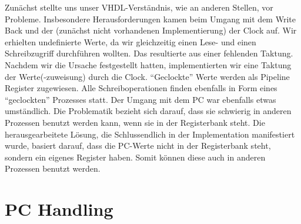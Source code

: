 \documentclass[paper=a4,fontsize=12pt,twocolumn]{scrreprt}
\begin{document}



Zunächst stellte uns unser VHDL-Verständnis, wie an anderen Stellen, vor Probleme.
Insbesondere Herausforderungen kamen beim Umgang mit dem Write Back und der (zunächst nicht vorhandenen Implementierung) der Clock auf.
Wir erhielten undefinierte Werte, da wir gleichzeitig einen Lese- und einen Schreibzugriff durchführen wollten.
Das resultierte aus einer fehlenden Taktung.
Nachdem wir die Ursache festgestellt hatten, implementierten wir eine Taktung der Werte(-zuweisung) durch die Clock.
\enquote{Geclockte} Werte werden als Pipeline Register zugewiesen.
Alle Schreiboperationen finden ebenfalls in Form eines \enquote{geclockten} Prozesses statt. Der Umgang mit dem PC war ebenfalls etwas umständlich.
Die Problematik bezieht sich darauf, dass sie schwierig in anderen Prozessen benutzt werden kann, wenn sie in der Registerbank steht.
Die herausgearbeitete Lösung, die Schlussendlich in der Implementation manifestiert wurde, basiert darauf, dass die PC-Werte nicht in der Registerbank steht, sondern ein eigenes Register haben.
Somit können diese auch in anderen Prozessen benutzt werden.

\section{PC Handling}

\end{document}
